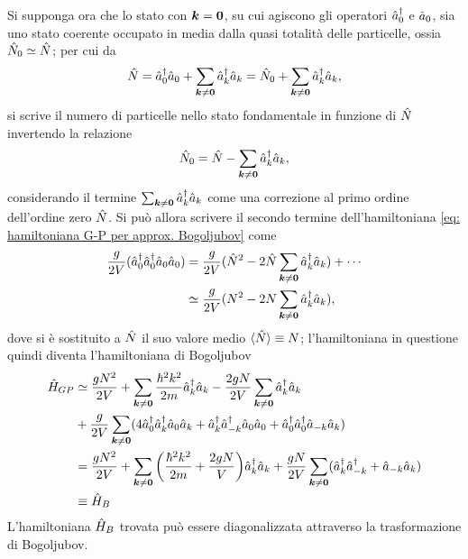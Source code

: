 Si supponga ora che lo stato con $\bm{k} = \bm{0}$, su cui agiscono gli operatori $\hat{a}^\dagger_0$ e $\hat{a}_0$, sia uno stato coerente occupato in media dalla quasi totalità delle particelle, ossia $\hat{N}_0 \simeq \hat{N}$; per cui da
\begin{equation}
    \hat{N} = \hat{a}^\dagger_0\hat{a}_0 + \sum_{\bm{k} \neq \bm{0}}\hat{a}^\dagger_k\hat{a}_k = \hat{N}_0 + \sum_{\bm{k} \neq \bm{0}}\hat{a}^\dagger_k\hat{a}_k,
\end{equation}
si scrive il numero di particelle nello stato fondamentale in funzione di $\hat{N}$ invertendo la relazione
\begin{equation}
    \hat{N}_0 = \hat{N} - \sum_{\bm{k} \neq \bm{0}}\hat{a}^\dagger_k\hat{a}_k,
\end{equation}
considerando il termine $\sum_{\bm{k} \neq \bm{0}}\hat{a}^\dagger_k\hat{a}_k$ come una correzione al primo ordine dell'ordine zero $\hat{N}$. Si può allora scrivere il secondo termine dell'hamiltoniana \eqref{eq: hamiltoniana G-P per approx. Bogoljubov} come
\begin{equation}
    \begin{split}
        \frac{g}{2V}(\hat{a}^\dagger_0\hat{a}^\dagger_0\hat{a}_0\hat{a}_0) &= \frac{g}{2V}(\hat{N}^2 - 2\hat{N}\sum_{\bm{k} \neq \bm{0}}\hat{a}^\dagger_k\hat{a}_k) + \cdots \\
        &\simeq \frac{g}{2V}(N^2 - 2N\sum_{\bm{k} \neq \bm{0}}\hat{a}^\dagger_k\hat{a}_k),
    \end{split}
\end{equation}
dove si è sostituito a $\hat{N}$ il suo valore medio $\langle \hat{N} \rangle \equiv N$; l'hamiltoniana in questione quindi diventa l'hamiltoniana di Bogoljubov
\begin{equation}
\label{eq: hamiltoniana di Bogoljubov}
    \begin{split}
        \hat{H}_{GP} &\simeq \frac{gN^2}{2V} + \sum_{\bm{k} \neq \bm{0}}\frac{\hbar^2k^2}{2m}\hat{a}^\dagger_k\hat{a}_k - \frac{2gN}{2V}\sum_{\bm{k} \neq \bm{0}}\hat{a}^\dagger_k\hat{a}_k \\
        &+ \frac{g}{2V}\sum_{\bm{k} \neq \bm{0}}(4\hat{a}^\dagger_0\hat{a}^\dagger_k\hat{a}_0\hat{a}_k + \hat{a}^\dagger_k\hat{a}^\dagger_{-k}\hat{a}_0\hat{a}_0 + \hat{a}^\dagger_0\hat{a}^\dagger_0\hat{a}_{-k}\hat{a}_k) \\
        &= \frac{gN^2}{2V} + \sum_{\bm{k} \neq \bm{0}}\bigg(\frac{\hbar^2k^2}{2m} + \frac{2gN}{V}\bigg)\hat{a}^\dagger_k\hat{a}_k + \frac{gN}{2V}\sum_{\bm{k} \neq \bm{0}}(\hat{a}^\dagger_k\hat{a}^\dagger_{-k} + \hat{a}_{-k}\hat{a}_k) \\
        &\equiv \hat{H}_B
    \end{split}
\end{equation}
L'hamiltoniana $\hat{H}_B$ trovata può essere diagonalizzata attraverso la trasformazione di Bogoljubov.

